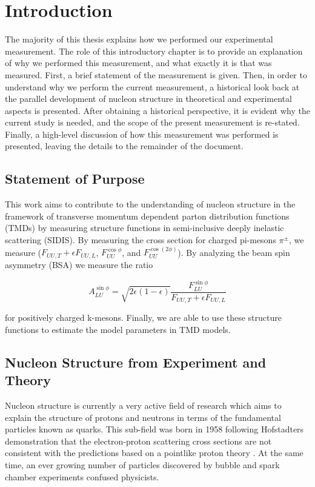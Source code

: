 \chapter{Introduction}
The majority of this thesis explains how we performed our experimental measurement.  The role of this introductory chapter is to provide an explanation of why we performed this measurement, and what exactly it is that was measured.  First, a brief statement of the measurement is given.  Then, in order to understand why we perform the current measurement, a historical look back at the parallel development of nucleon structure in theoretical and experimental aspects is presented.  After obtaining a historical perspective, it is evident why the current study is needed, and the scope of the present measurement is re-stated.  Finally, a high-level discussion of how this measurement was performed is presented, leaving the details to the remainder of the document.

\section{Statement of Purpose}
This work aims to contribute to the understanding of nucleon structure in the framework of transverse momentum dependent parton distribution functions (TMDs) by measuring structure functions in semi-inclusive deeply inelastic scattering (SIDIS).  By measuring the cross section for charged pi-mesons $\pi^{\pm}$, we measure ($F_{UU,T} + \epsilon F_{UU,L}$, $F_{UU}^{\cos\phi}$, and $F_{UU}^{\cos(2\phi)}$).  By analyzing the beam spin asymmetry (BSA) we measure the ratio

\begin{equation}
  A_{LU}^{\sin\phi} = \sqrt{2\epsilon(1-\epsilon)} \frac{F_{LU}^{\sin\phi}}{F_{UU,T}+\epsilon F_{UU,L}}
\end{equation}

for positively charged k-mesons.  Finally, we are able to use these structure functions to estimate the model parameters in TMD models.

\section{Nucleon Structure from Experiment and Theory}

Nucleon structure is currently a very active field of research which aims to explain the structure of protons and neutrons in terms of the fundamental particles known as quarks.  This sub-field was born in 1958 following Hofstadters demonstration that the electron-proton scattering cross sections are not consistent with the predictions based on a pointlike proton theory \cite{history-hofstadter:1955}.  At the same time, an ever growing number of particles discovered by bubble and spark chamber experiments confused physicists.

